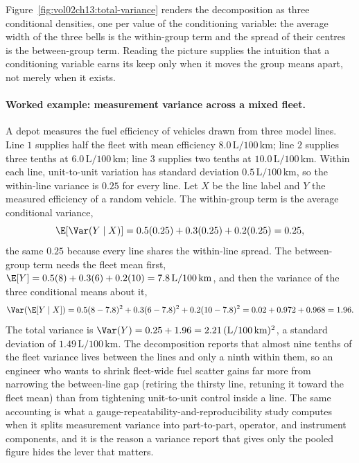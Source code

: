 

Figure~\ref{fig:vol02ch13:total-variance} renders the decomposition as
three conditional densities, one per value of the conditioning variable:
the average width of the three bells is the within-group term and the
spread of their centres is the between-group term. Reading the picture
supplies the intuition that a conditioning variable earns its keep only
when it moves the group means apart, not merely when it exists.

\paragraph{Worked example: measurement variance across a mixed fleet.}
A depot measures the fuel efficiency of vehicles drawn from three model
lines. Line $1$ supplies half the fleet with mean efficiency
$8.0\,\text{L}/100\,\text{km}$; line $2$ supplies three tenths at
$6.0\,\text{L}/100\,\text{km}$; line $3$ supplies two tenths at
$10.0\,\text{L}/100\,\text{km}$. Within each line, unit-to-unit
variation has standard deviation $0.5\,\text{L}/100\,\text{km}$, so the
within-line variance is $0.25$ for every line. Let $X$ be the line
label and $Y$ the measured efficiency of a random vehicle. The
within-group term is the average conditional variance,
\[
\E[\Var(Y \mid X)] = 0.5(0.25) + 0.3(0.25) + 0.2(0.25) = 0.25,
\]
the same $0.25$ because every line shares the within-line spread. The
between-group term needs the fleet mean first,
$\E[Y] = 0.5(8) + 0.3(6) + 0.2(10) = 7.8\,\text{L}/100\,\text{km}$, and
then the variance of the three conditional means about it,
\[
\Var(\E[Y \mid X]) = 0.5(8 - 7.8)^{2} + 0.3(6 - 7.8)^{2}
+ 0.2(10 - 7.8)^{2} = 0.02 + 0.972 + 0.968 = 1.96.
\]
The total variance is $\Var(Y) = 0.25 + 1.96 = 2.21\,(\text{L}/100\,
\text{km})^{2}$, a standard deviation of $1.49\,\text{L}/100\,\text{km}$.
The decomposition reports that almost nine tenths of the fleet variance
lives between the lines and only a ninth within them, so an engineer who
wants to shrink fleet-wide fuel scatter gains far more from narrowing the
between-line gap (retiring the thirsty line, retuning it toward the
fleet mean) than from tightening unit-to-unit control inside a line. The
same accounting is what a gauge-repeatability-and-reproducibility study
computes when it splits measurement variance into part-to-part,
operator, and instrument components, and it is the reason a variance
report that gives only the pooled figure hides the lever that matters.

